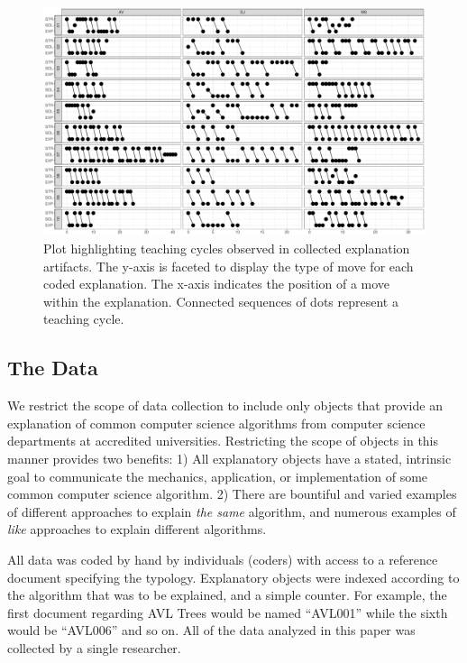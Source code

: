 \documentclass[conference]{IEEEtran}
\begin{document}
\begin{figure}
\centering
\includegraphics[width=\textwidth]{teachCyclesPltCombined}
\caption{Plot highlighting teaching cycles observed in collected explanation
artifacts. The y-axis is faceted to display the type of move for each coded
explanation. The x-axis indicates the position of a move within the
explanation. Connected sequences of dots represent a teaching cycle.}
\label{fig:cycles-plot}
\end{figure}

\subsection{The Data}
\label{sec:exp:data}

We restrict the scope of data collection to include only objects that provide an
explanation of common computer science algorithms from computer
science departments at accredited universities. Restricting the scope of objects
in this manner provides two benefits: 1) All explanatory objects have a stated,
intrinsic goal to communicate the mechanics, application, or implementation of
some common computer science algorithm. 2) There are bountiful and varied
examples of different approaches to explain \emph{the same} algorithm, and numerous
examples of \emph{like} approaches to explain different algorithms.

All data was coded by hand by individuals (coders) with access to a reference
document specifying the typology. Explanatory objects were indexed according to
the algorithm that was to be explained, and a simple counter. For example, the
first document regarding AVL Trees would be named ``AVL001'' while the sixth
would be ``AVL006'' and so on. All of the data analyzed in this paper was
collected by a single researcher. 
\end{document}
